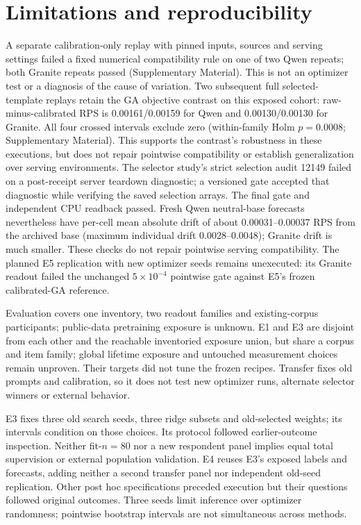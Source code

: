 \documentclass[sigconf,anonymous]{aamas}
\begin{document}
\section{Limitations and reproducibility}
A separate calibration-only replay with pinned inputs, sources and serving
settings failed a fixed numerical compatibility rule on one of two Qwen
repeats; both Granite repeats passed (Supplementary Material).
This is not an optimizer test or a diagnosis of the cause of variation.
Two subsequent full selected-template replays retain the GA objective contrast
on this exposed cohort: raw-minus-calibrated RPS is 0.00161/0.00159 for Qwen
and 0.00130/0.00130 for Granite. All four crossed intervals exclude zero
(within-family Holm $p=0.0008$; Supplementary Material). This supports the
contrast's robustness in these executions, but does not repair pointwise
compatibility or establish generalization over serving environments.
The selector study's strict selection audit 12149 failed on a post-receipt
server teardown diagnostic; a versioned gate accepted that diagnostic while
verifying the saved selection arrays. The final gate and independent CPU
readback passed. Fresh Qwen neutral-base forecasts nevertheless have per-cell
mean absolute drift of about 0.00031--0.00037 RPS from the archived base
(maximum individual drift 0.0028--0.0048); Granite drift is much smaller.
These checks do not repair pointwise serving compatibility.
The planned E5 replication with new optimizer seeds remains unexecuted:
its Granite readout failed the unchanged $5\times10^{-4}$ pointwise gate
against E5's frozen calibrated-GA reference.

Evaluation covers one inventory, two readout families and existing-corpus
participants; public-data pretraining exposure is unknown. E1 and E3 are disjoint from each other and
the reachable inventoried exposure union, but share a corpus and item family;
global lifetime exposure and untouched measurement choices remain unproven.
Their targets did not tune the frozen recipes. Transfer fixes old prompts and
calibration, so it does not test new optimizer runs, alternate selector
winners or external behavior.

E3 fixes three old search seeds, three ridge subsets and old-selected weights;
its intervals condition on those choices. Its protocol followed earlier-outcome inspection. Neither fit-$n=80$ nor a new respondent panel
implies equal total supervision or external population validation. E4 reuses
E3's exposed labels and forecasts, adding neither a second transfer panel nor
independent old-seed replication. Other post hoc specifications preceded
execution but their questions followed original outcomes. Three seeds limit
inference over optimizer randomness; pointwise bootstrap intervals are not
simultaneous across methods.
\end{document}
